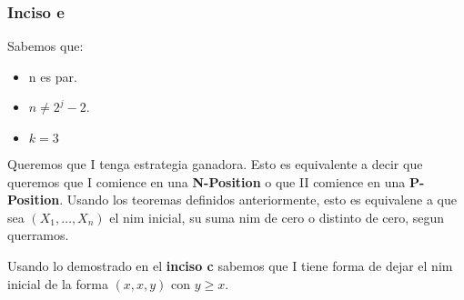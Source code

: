 \subsubsection{Inciso e}
Sabemos que:
\begin{itemize}
	\item n es par.
	\item $n \neq 2^j - 2$.
	\item $k = 3$ 
\end{itemize}

Queremos que I tenga estrategia ganadora. Esto es equivalente a decir que queremos que I comience en una \textbf{N-Position} o que II comience en una \textbf{P-Position}. Usando los teoremas definidos anteriormente, esto es equivalene a que sea $(X_1, \dots, X_n)$ el nim inicial, su suma nim de cero o distinto de cero, segun querramos.

Usando lo demostrado en el \textbf{inciso c} sabemos que I tiene forma de dejar el nim inicial de la forma $(x, x, y)$ con $y \geq x$.\\

